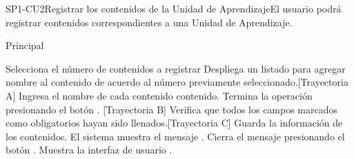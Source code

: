 \begin{UseCase}{SP1-CU2}{Registrar los contenidos de la Unidad de Aprendizaje}{El usuario podrá registrar contenidos correspondientes a una Unidad de Aprendizaje.}
\end{UseCase}

\begin{UCtrayectoria}{Principal}

    \UCpaso[\UCactor] Selecciona el número de contenidos a registrar
    \UCpaso Despliega un listado para agregar nombre al contenido de acuerdo al número previamente seleccionado.[Trayectoria A]
    \UCpaso[\UCactor] Ingresa el nombre de cada contenido contenido.
    \UCpaso[\UCactor] Termina la operación presionando el botón . [Trayectoria B]
    \UCpaso Verifica que todos los campos marcados como obligatorios hayan sido llenados.[Trayectoria C]
    \UCpaso Guarda la información de los contenidos.
    \UCpaso El sistema muestra el mensaje .
    \UCpaso[\UCactor] Cierra el mensaje presionando el botón .
    \UCpaso Muestra la interfaz de usuario .
\end{UCtrayectoria}


